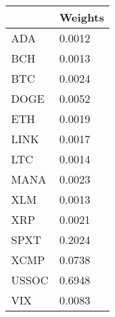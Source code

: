 \begin{tabular}{ll}
\toprule
 & Weights \\
\midrule
ADA & 0.0012 \\
BCH & 0.0013 \\
BTC & 0.0024 \\
DOGE & 0.0052 \\
ETH & 0.0019 \\
LINK & 0.0017 \\
LTC & 0.0014 \\
MANA & 0.0023 \\
XLM & 0.0013 \\
XRP & 0.0021 \\
SPXT & 0.2024 \\
XCMP & 0.0738 \\
USSOC & 0.6948 \\
VIX & 0.0083 \\
\bottomrule
\end{tabular}
